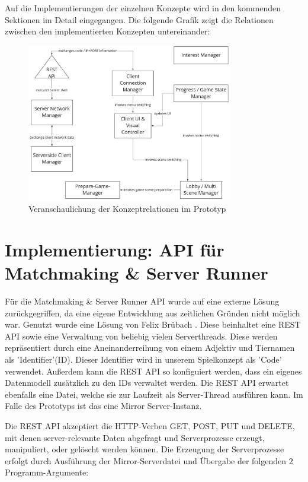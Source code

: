 Auf die Implementierungen der einzelnen Konzepte wird in den kommenden Sektionen im Detail eingegangen. Die folgende Grafik zeigt die Relationen zwischen den implementierten Konzepten untereinander:

\begin{figure}[H]
	\centering
	\includegraphics[width=90mm]{images/concept_relations.jpg}
	\caption[Architektur Konzept Relationen]{Veranschaulichung der Konzeptrelationen im Prototyp}
	\label{pic:concept_relations}
\end{figure}

\section{Implementierung: API für Matchmaking \& Server Runner}

Für die Matchmaking \& Server Runner API wurde auf eine externe Lösung zurückgegriffen, da eine eigene Entwicklung aus zeitlichen Gründen nicht möglich war. Genutzt wurde eine Lösung von Felix Brübach \cite{GitHub.20.02.2022}. Diese beinhaltet eine REST API sowie eine Verwaltung von beliebig vielen Serverthreads. Diese werden repräsentiert durch eine Aneinanderreihung von einem Adjektiv und Tiernamen als 'Identifier'(ID). Dieser Identifier wird in unserem Spielkonzept als 'Code' verwendet. Außerdem kann die REST API so konfiguiert werden, dass ein eigenes Datenmodell zusätzlich zu den IDs verwaltet werden. Die REST API erwartet ebenfalls eine Datei, welche sie zur Laufzeit als Server-Thread ausführen kann. Im Falle des Prototyps ist das eine Mirror Server-Instanz.

Die REST API akzeptiert die HTTP-Verben GET, POST, PUT und DELETE, mit denen server-relevante Daten abgefragt und Serverprozesse erzeugt, manipuliert, oder gelöscht werden können. Die Erzeugung der Serverprozesse erfolgt durch Ausführung der Mirror-Serverdatei und Übergabe der folgenden 2 Programm-Argumente:


